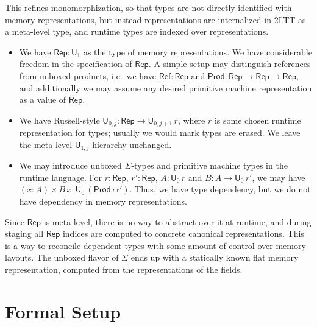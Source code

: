 \documentclass[acmsmall,screen]{acmart}
\newcommand{\msf}[1]{\mathsf{#1}}
\newcommand{\U}{\msf{U}}
\newcommand{\Nat}{\msf{Nat}}
\newcommand{\Rep}{\msf{Rep}}
\theoremstyle{remark}
\begin{document}
This refines monomorphization, so that types are not directly identified with
memory representations, but instead representations are internalized in 2LTT as
a meta-level type, and runtime types are indexed over representations.
\begin{itemize}
\item We have $\Rep : \U_1$ as the type of memory representations. We have
  considerable freedom in the specification of $\Rep$. A simple setup may
  distinguish references from unboxed products, i.e.\ we have $\msf{Ref} : \Rep$
  and $\msf{Prod} : \Rep \to \Rep \to \Rep$, and additionally we may assume
  any desired primitive machine representation as a value of $\Rep$.
\item We have Russell-style $\U_{0,j} : \Rep \to \U_{0, j+1}\,r$, where $r$ is
  some chosen runtime representation for types; usually we would mark types are
  erased. We leave the meta-level $\U_{1,j}$ hierarchy unchanged.
\item We may introduce unboxed $\Sigma$-types and primitive machine types in the
  runtime language. For $r : \Rep$, $r' : \Rep$, $A : \U_{0}\,r$ and $B : A \to
  \U_{0}\,r'$, we may have $(x : A) \times B\,x :
  \U_{0}\,(\msf{Prod\,r\,r'})$. Thus, we have type dependency, but we do not
  have dependency in memory representations.
\end{itemize}
Since $\Rep$ is meta-level, there is no way to abstract over it at runtime, and
during staging all $\Rep$ indices are computed to concrete canonical
representations. This is a way to reconcile dependent types with some amount of
control over memory layouts. The unboxed flavor of $\Sigma$ ends up with a
statically known flat memory representation, computed from the representations
of the fields.


\section{Formal Setup}\label{sec:formal-2ltt}
\end{document}
